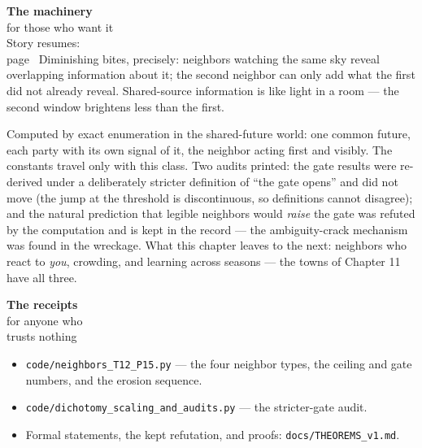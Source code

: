 \begin{machinery}{\textbf{The machinery}\\for those who want it\\[3pt]{\color{muted}Story resumes:\\page~\pageref{ch11}}}
Diminishing bites, precisely: neighbors watching the same sky reveal
overlapping information about it; the second neighbor can only add
what the first did not already reveal. Shared-source information is
like light in a room --- the second window brightens less than the
first.


Computed by exact enumeration in the shared-future world: one common
future, each party with its own signal of it, the neighbor acting
first and visibly. The constants travel only with this class. Two
audits printed: the gate results were re-derived under a deliberately
stricter definition of ``the gate opens'' and did not move (the jump at
the threshold is discontinuous, so definitions cannot disagree); and
the natural prediction that legible neighbors would \emph{raise} the gate
was refuted by the computation and is kept in the record --- the
ambiguity-crack mechanism was found in the wreckage. What this
chapter leaves to the next: neighbors who react to \emph{you}, crowding,
and learning across seasons --- the towns of Chapter 11 have all three.

\end{machinery}

\begin{receipts}{\textbf{The receipts}\\for anyone who\\trusts nothing}


\begin{itemize}
\tightlist
\item
  \texttt{code/\allowbreak{}neighbors\_\allowbreak{}T12\_\allowbreak{}P15.\allowbreak{}py} --- the four neighbor types, the ceiling
  and gate numbers, and the erosion sequence.
\item
  \texttt{code/\allowbreak{}dichotomy\_\allowbreak{}scaling\_\allowbreak{}and\_\allowbreak{}audits.\allowbreak{}py} --- the stricter-gate audit.
\item
  Formal statements, the kept refutation, and proofs:
  \texttt{docs/\allowbreak{}THEOREMS\_\allowbreak{}v1.\allowbreak{}md}.
\end{itemize}

\end{receipts}




